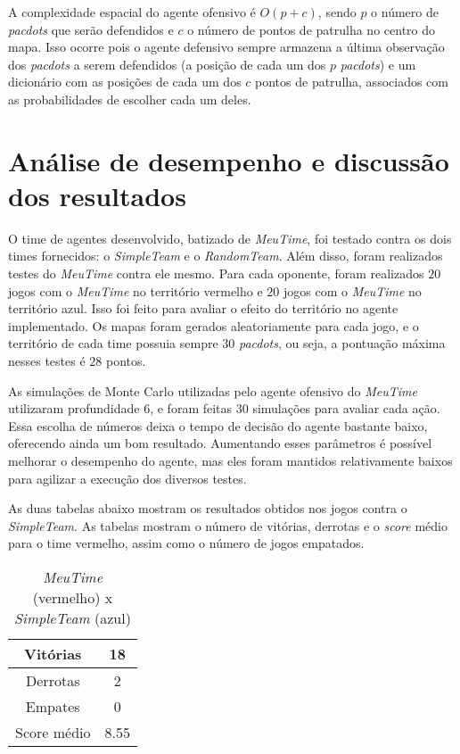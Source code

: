 \documentclass[a4paper,12pt]{article}
\begin{document}
A complexidade espacial do agente ofensivo é $O(p + c)$, sendo $p$ o número de \textit{pacdots}
que serão defendidos e $c$ o número de pontos de patrulha no centro do mapa. Isso ocorre pois o
agente defensivo sempre armazena a última observação dos \textit{pacdots} a serem defendidos
(a posição de cada um dos $p$ \textit{pacdots}) e um dicionário com as posições de cada um dos $c$
pontos de patrulha, associados com as probabilidades de escolher cada um deles.

\section{Análise de desempenho e discussão dos resultados}

O time de agentes desenvolvido, batizado de \textit{MeuTime}, foi testado contra os dois
times fornecidos: o \textit{SimpleTeam} e o \textit{RandomTeam}. Além disso, foram
realizados testes do \textit{MeuTime} contra ele mesmo. Para cada oponente, foram realizados
$20$ jogos com o \textit{MeuTime} no território vermelho e $20$ jogos com o \textit{MeuTime}
no território azul. Isso foi feito para avaliar o efeito do território no agente implementado.
Os mapas foram gerados aleatoriamente para cada jogo, e o território de cada time
possuia sempre $30$ \textit{pacdots}, ou seja, a pontuação máxima nesses testes é $28$ pontos.

As simulações de Monte Carlo utilizadas pelo agente ofensivo do \textit{MeuTime} utilizaram
profundidade $6$, e foram feitas $30$ simulações para avaliar cada ação. Essa escolha de números
deixa o tempo de decisão do agente bastante baixo, oferecendo ainda um bom resultado.
Aumentando esses parâmetros é
possível melhorar o desempenho do agente, mas eles foram mantidos relativamente baixos
para agilizar a execução dos diversos testes.

As duas tabelas abaixo mostram os resultados obtidos nos jogos contra o \textit{SimpleTeam}.
As tabelas mostram o número de vitórias, derrotas e o \textit{score} médio para o time vermelho,
assim como o número de jogos empatados.

\begin{table}[htb!]
    {\centering
    \begin{tabular}{|c|c|} \hline
    Vitórias     & 18   \\ \hline
    Derrotas     & 2    \\ \hline
    Empates      & 0    \\ \hline
    Score médio  & 8.55 \\ \hline
    \end{tabular}
    \caption{\textit{MeuTime} (vermelho) x \textit{SimpleTeam} (azul)}
    }
\end{table}
\end{document}
